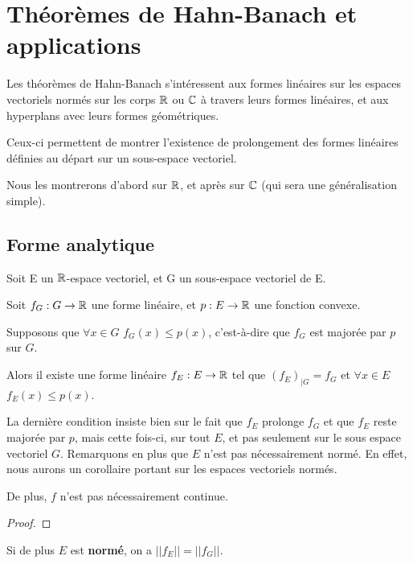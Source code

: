 \chapter{Théorèmes de Hahn-Banach et applications}

Les théorèmes de Hahn-Banach s'intéressent aux formes linéaires sur les espaces
vectoriels normés sur les corps $\mathbb{R}$ ou $\mathbb{C}$ à travers leurs formes
linéaires, et aux hyperplans avec leurs formes géométriques.

Ceux-ci permettent de montrer l'existence de prolongement des formes linéaires
définies au départ sur un sous-espace vectoriel.

Nous les montrerons d'abord sur $\mathbb{R}$, et après sur $\mathbb{C}$ (qui sera une
généralisation simple).

\section{Forme analytique}

\begin{theorem} 
\label{theorem_hahn_banach_analytic_1}
	Soit E un $\mathbb{R}$-espace vectoriel, et G un sous-espace vectoriel de E.

	Soit $f_{G} : G \rightarrow \mathbb{R}$ une forme linéaire, et
	$p : E \rightarrow \mathbb{R}$ une fonction convexe.

	Supposons que $\forall x \in G$ $f_{G}(x) \leq p(x)$, c'est-à-dire que
	$f_{G}$ est majorée par $p$ sur $G$.

	Alors il existe une forme linéaire $f_{E} : E \rightarrow \mathbb{R}$ tel que
	${(f_{E})}_{|G} = f_{G}$ et $\forall x \in E$ $f_{E}(x) \leq p(x)$.
\end{theorem}

La dernière condition insiste bien sur le fait que $f_{E}$ prolonge $f_{G}$ et
que $f_{E}$ reste majorée par $p$, mais cette fois-ci, sur tout $E$, et pas
seulement sur le sous espace vectoriel $G$.
Remarquons en plus que $E$ n'est pas nécessairement normé. En effet, nous aurons
un corollaire portant sur les espaces vectoriels normés.

De plus, $f$ n'est pas nécessairement continue.

\begin{proof}

\end{proof}

\begin{corollary}
	Si de plus $E$ est \textbf{normé}, on a $||f_{E}|| = ||f_{G}||$.
\end{corollary}

